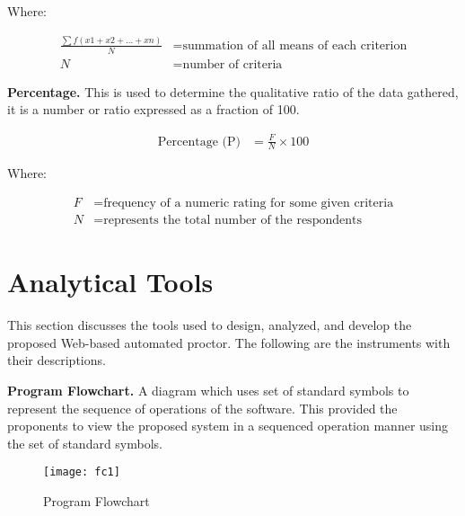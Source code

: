Where:

\begin{equation*}
   \begin{split}
      \frac{\sum f(x1 + x2 + ... + xn)}{N} & = \text{summation of all means of each criterion} \\
      N & = \text{number of criteria}
   \end{split}
\end{equation*}

\textbf{Percentage.}
This is used to determine the qualitative ratio of the data gathered, it is a number or ratio expressed as a fraction of 100.

\begin{equation*}
   \begin{split}
      \text{Percentage (P)} & = \frac{F}{N} \times 100
   \end{split}
\end{equation*}

Where:

\begin{equation*}
   \begin{split}
      F & = \text{frequency of a numeric rating for some given criteria} \\
      N & = \text{represents the total number of the respondents}
   \end{split}
\end{equation*}

\section{Analytical Tools}

This section discusses the tools used to design, analyzed, and develop the proposed Web-based automated proctor.
The following are the instruments with their descriptions.

\textbf{Program Flowchart.}
A diagram which uses set of standard symbols to represent the sequence of operations of the software.
This provided the proponents to view the proposed system in a sequenced operation manner using the set of standard symbols.

\begin{figure}[h!]
   \begin{center}
      \texttt{[image: fc1]}
      \caption{Program Flowchart}
   \end{center}
\end{figure}

\pagebreak

